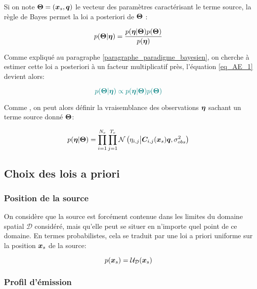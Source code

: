 Si on note ${\bm{\Theta}} = ({\bm{x}_s}, {\bm{q}})$ le vecteur des paramètres caractérisant le terme source, la règle de Bayes permet  la loi a posteriori de ${\bm{\Theta}}$ : 

\begin{equation}
p({\bm{\Theta}} | {\bm{\eta}}) = \dfrac{p({\bm{\eta}} | {\bm{\Theta}})p({\bm{\Theta}})}{p({\bm{\eta}})}
\label{eq_AE_1}
\end{equation}

Comme expliqué au paragraphe \ref{paragraphe_paradigme_bayesien}, on cherche à estimer cette loi a posteriori à un facteur multiplicatif près, l'équation \eqref{eq_AE_1} devient alors:

\begin{equation}
\NdFS{
p(\VecThetaMaj | \VecObs) \propto p(\VecObs | \VecThetaMaj)p(\VecThetaMaj)
}
\label{eq_AE_1_prop}
\end{equation}

Comme , on peut alors définir la vraisemblance des observations ${\bm{\eta}}$ sachant un terme source donné ${\bm{\Theta}}$:

\begin{equation}
p({\bm{\eta}} | {\bm{\Theta}}) = \prod\limits_{i=1}^{N_c} \prod\limits_{j=1}^{T_c}\mathcal{N}\left({\eta}_{i,j} \middle\vert {\bm{C}}_{i,j}({\bm{x}_s}){\bm{q}}, {\sigma_{obs}^2}\right)
\label{eq_AE_5}
\end{equation}

\subsection{Choix des lois a priori}

\subsubsection{Position de la source}

On considère que la source est forcément contenue dans les limites du domaine spatial $\mathcal{D}$ considéré, mais qu'elle peut se situer en n'importe quel point de ce domaine. En termes probabilistes, cela se traduit par une loi a priori uniforme sur la position ${\bm{x}_s}$ de la source:

\begin{equation}
p({\bm{x}_s}) = \mathcal{U}_\mathcal{D}({\bm{x}_s})
\label{eq_AE_7}
\end{equation}


\subsubsection{Profil d'émission}

